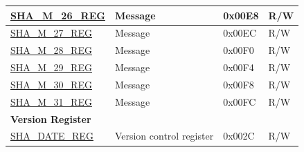 \begin{longtable}{ | l | l | l |l | }
\hyperref[regdesc:SHAMNREG]{SHA\_M\_26\_REG} & Message & 0x00E8 & R/W \\ \hline
\hyperref[regdesc:SHAMNREG]{SHA\_M\_27\_REG} & Message & 0x00EC & R/W \\ \hline
\hyperref[regdesc:SHAMNREG]{SHA\_M\_28\_REG} & Message & 0x00F0 & R/W \\ \hline
\hyperref[regdesc:SHAMNREG]{SHA\_M\_29\_REG} & Message & 0x00F4 & R/W \\ \hline
\hyperref[regdesc:SHAMNREG]{SHA\_M\_30\_REG} & Message & 0x00F8 & R/W \\ \hline
\hyperref[regdesc:SHAMNREG]{SHA\_M\_31\_REG} & Message & 0x00FC & R/W \\ \hline
\multicolumn{4}{|l|}{\textbf{Version Register}} \\ \hline
\hyperref[regdesc:SHADATEREG]{SHA\_DATE\_REG} & Version control register & 0x002C & R/W \\ \hline
\end{longtable}
